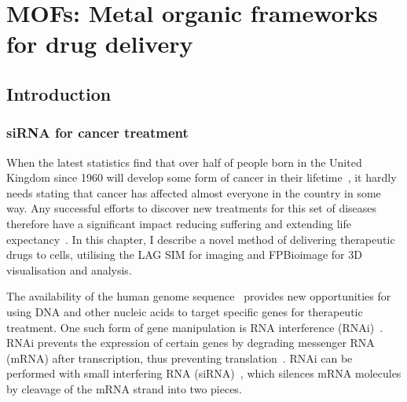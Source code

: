 \chapter{MOFs: Metal organic frameworks for drug delivery} \label{chap:MOF}


\ifpdf
    \graphicspath{{Chapter4/Figs/Raster/}{Chapter4/Figs/PDF/}{Chapter4/Figs/}}
\else
    \graphicspath{{Chapter4/Figs/Vector/}{Chapter4/Figs/}}
\fi

%

\section{Introduction} \label{sec:MOF-intro}
\subsection{siRNA for cancer treatment}
When the latest statistics find that over half of people born in the United Kingdom since 1960 will develop some form of cancer in their lifetime~\cite{ahmad2015trends}, it hardly needs stating that cancer has affected almost everyone in the country in some way.
Any successful efforts to discover new treatments for this set of diseases therefore have a significant impact reducing suffering and extending life expectancy~\cite{hesketh2012betrayed}.
In this chapter, I describe a novel method of delivering therapeutic drugs to cells, utilising the LAG SIM for imaging and FPBioimage for 3D visualisation and analysis.

The availability of the human genome sequence~\cite{venter2001sequence, bentley2008accurate} provides new opportunities for using DNA and other nucleic acids to target specific genes for therapeutic treatment.
One such form of gene manipulation is RNA interference (RNAi)~\cite{fire1998potent, timmons1998specific}.
RNAi prevents the expression of certain genes by degrading messenger RNA (mRNA) after transcription, thus preventing translation~\cite{hannon2002rna}.
RNAi can be performed with small interfering RNA (siRNA)~\cite{hamilton1999species, elbashir2001duplexes}, which silences mRNA molecules by cleavage of the mRNA strand into two pieces.

